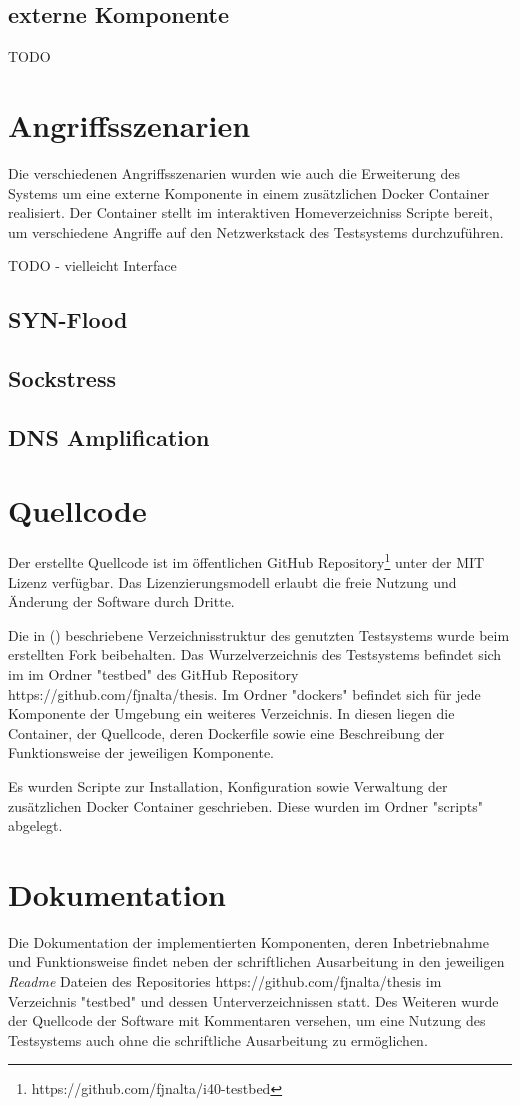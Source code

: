 \subsection{externe Komponente}
TODO 

\section{Angriffsszenarien}
Die verschiedenen Angriffsszenarien wurden wie auch die Erweiterung des Systems um eine externe Komponente in einem zusätzlichen Docker Container realisiert. Der Container stellt im interaktiven Homeverzeichniss Scripte bereit, um verschiedene Angriffe auf den Netzwerkstack des Testsystems durchzuführen.

TODO - vielleicht Interface

\subsection{SYN-Flood}
\subsection{Sockstress}
\subsection{\ac{DNS} Amplification}


\section{Quellcode}
Der erstellte Quellcode ist im öffentlichen GitHub Repository\footnote{https://github.com/fjnalta/i40-testbed} unter der \ac{MIT} Lizenz verfügbar. Das Lizenzierungsmodell erlaubt die freie Nutzung und Änderung der Software durch Dritte.

Die in (\cite{Weber2018}) beschriebene Verzeichnisstruktur des genutzten Testsystems wurde beim erstellten Fork beibehalten. Das Wurzelverzeichnis des Testsystems befindet sich im im Ordner "testbed" des GitHub Repository https://github.com/fjnalta/thesis. Im Ordner "dockers" befindet sich für jede Komponente der Umgebung ein weiteres Verzeichnis. In diesen liegen die Container, der Quellcode, deren Dockerfile sowie eine Beschreibung der Funktionsweise der jeweiligen Komponente.

Es wurden Scripte zur Installation, Konfiguration sowie Verwaltung der zusätzlichen Docker Container geschrieben. Diese wurden im Ordner "scripts" abgelegt.

\section{Dokumentation}
Die Dokumentation der implementierten Komponenten, deren Inbetriebnahme und Funktionsweise findet neben der schriftlichen Ausarbeitung in den jeweiligen \textit{Readme} Dateien des Repositories https://github.com/fjnalta/thesis im Verzeichnis "testbed" und dessen Unterverzeichnissen statt. Des Weiteren wurde der Quellcode der Software mit Kommentaren versehen, um eine Nutzung des Testsystems auch ohne die schriftliche Ausarbeitung zu ermöglichen.